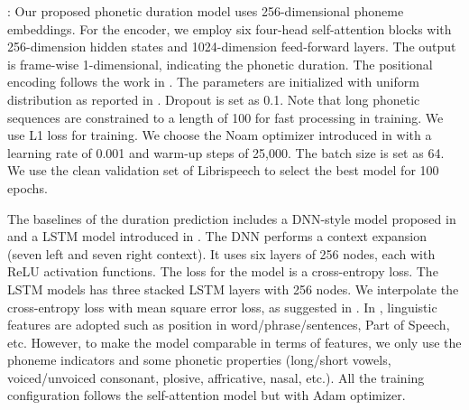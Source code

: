 \documentclass[a4paper]{article}
\begin{document}
\vspace{5pt}
: Our proposed phonetic duration model uses 256-dimensional phoneme embeddings. For the encoder, we employ six four-head self-attention blocks with 256-dimension hidden states and 1024-dimension feed-forward layers. The output is frame-wise 1-dimensional, indicating the phonetic duration. The positional encoding follows the work in \cite{vaswani2017attention}. The parameters are initialized with uniform distribution as reported in \cite{glorot2010understanding}. Dropout is set as 0.1. Note that long phonetic sequences are constrained to a length of 100 for fast processing in training. 
We use L1 loss for training. We choose the Noam optimizer introduced in \cite{vaswani2017attention} with a learning rate of 0.001 and warm-up steps of 25,000. The batch size is set as 64. We use the clean validation set of Librispeech to select the best model for 100 epochs.

The baselines of the duration prediction includes a DNN-style model proposed in \cite{wei2019neural} and a LSTM model introduced in \cite{chen2017discrete}. The DNN performs a context expansion (seven left and seven right context). It uses six layers of 256 nodes, each with ReLU activation functions. The loss for the model is a cross-entropy loss. The LSTM models has three stacked LSTM layers with 256 nodes. We interpolate the cross-entropy loss with mean square error loss, as suggested in \cite{chen2017discrete}. In \cite{chen2017discrete, wei2019neural}, linguistic features are adopted such as position in word/phrase/sentences, Part of Speech, etc. However, to make the model comparable in terms of features, we only use the phoneme indicators and some phonetic properties (long/short vowels, voiced/unvoiced consonant, plosive, affricative, nasal, etc.). All the training configuration follows the self-attention model but with Adam optimizer.
\end{document}
